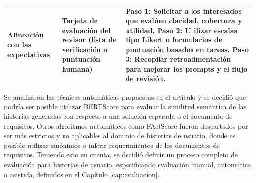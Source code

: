 \begin{longtable}{|p{3cm}| p{4cm} |p{4cm}|}
\hline

\textbf{Alineación con las expectativas} &
Tarjeta de evaluación del revisor (lista de verificación o puntuación humana) &
Paso 1: Solicitar a los interesados que evalúen claridad, cobertura y utilidad. \newline
Paso 2: Utilizar escalas tipo Likert o formularios de puntuación basados en tareas. \newline
Paso 3: Recopilar retroalimentación para mejorar los prompts y el flujo de revisión. \\

\hline
\end{longtable}

Se analizaron las técnicas automáticas propuestas en el artículo y se decidió que podría ser posible utilizar BERTScore para evaluar la similitud semántica de las historias generadas con respecto a una solución esperada o el documento de requisitos. Otros algoritmos automáticos como FActScore fueron descartados por ser más estrictos y no aplicables al dominio de historias de usuario, donde es posible utilizar sinónimos o inferir requerimientos de los documentos de requisitos. Teniendo esto en cuenta, se decidió definir un proceso completo de evaluación para historias de usuario, especificando evaluación manual, automática o asistida, definidos en el Capítulo \ref{cap:evaluacion}.